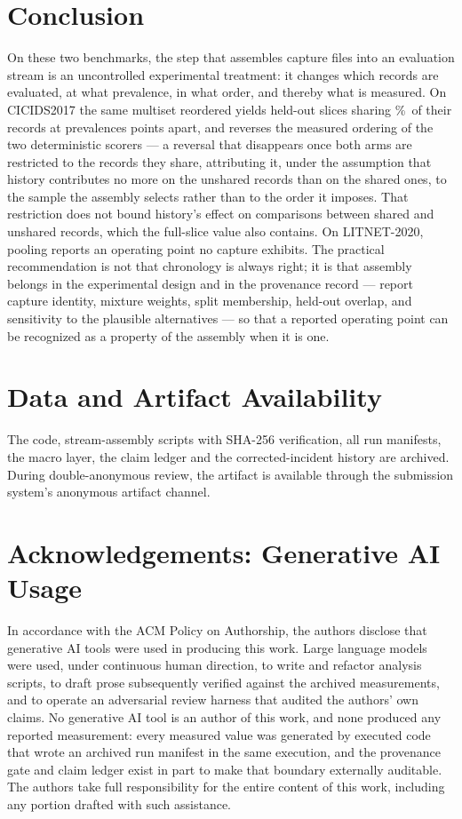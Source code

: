 \documentclass[manuscript,anonymous,review]{acmart}
\begin{document}
\section{Conclusion}
\label{sec:conclusion}

On these two benchmarks, the step that assembles capture files into an
evaluation stream is an uncontrolled experimental treatment: it changes which
records are evaluated, at what prevalence, in what order, and thereby what is
measured. On CICIDS2017 the same multiset reordered yields held-out slices
sharing \CicidsHeldoutOverlapPct\%\ of their records at prevalences
\SFourCicidsPrevShiftAbsPp{} points apart, and reverses the measured ordering
of the two deterministic scorers --- a reversal that disappears once both arms
are restricted to the records they share, attributing it, under the assumption
that history contributes no more on the unshared records than on the shared
ones, to the sample the assembly selects rather than to the order it imposes.
That restriction does not bound history's effect on comparisons between shared
and unshared records, which the full-slice value also contains. On LITNET-2020,
pooling reports an operating point no capture exhibits. The practical recommendation is not that chronology
is always right; it is that assembly belongs in the experimental design and in
the provenance record --- report capture identity, mixture weights, split
membership, held-out overlap, and sensitivity to the plausible alternatives ---
so that a reported operating point can be recognized as a property of the
assembly when it is one.

\section*{Data and Artifact Availability}
The code, stream-assembly scripts with SHA-256 verification, all run manifests,
the macro layer, the claim ledger and the corrected-incident history are
archived. During double-anonymous review, the artifact is available through the
submission system's anonymous artifact channel.

\section*{Acknowledgements: Generative AI Usage}
In accordance with the ACM Policy on Authorship, the authors disclose that
generative AI tools were used in producing this work. Large language models
were used, under continuous human direction, to write and refactor analysis
scripts, to draft prose subsequently verified against the archived
measurements, and to operate an adversarial review harness that audited the
authors' own claims. No generative AI tool is an author of this work, and none
produced any reported measurement: every measured value was generated by
executed code that wrote an archived run manifest in the same execution, and the provenance gate
and claim ledger exist in part to make that boundary externally auditable. The
authors take full responsibility for the entire content of this work,
including any portion drafted with such assistance.
\end{document}
